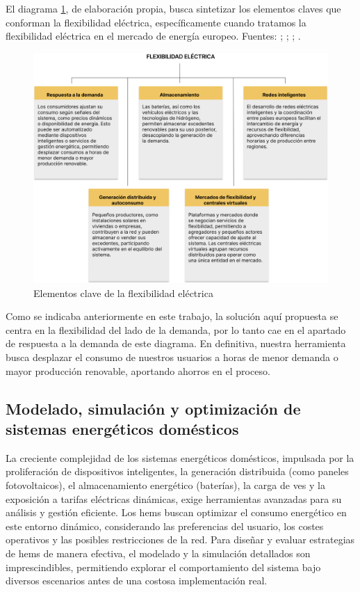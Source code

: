 \documentclass[11pt,a4paper]{book}
\begin{document}
El diagrama \ref{fig:flexibilidad}, de elaboración propia, busca sintetizar los elementos claves que conforman la flexibilidad eléctrica, específicamente cuando tratamos la flexibilidad eléctrica en el mercado de energía europeo. Fuentes: \cite{iberdrolaFlexibilidad2024}; \cite{centralesVirtuales2024}; \cite{cordisParticipation2024}; \cite{irenaFlexibilidad2018}.


\begin{figure}
    \centering
    \includegraphics[width=1\linewidth]{fig/image.png}
    \caption{Elementos clave de la flexibilidad eléctrica}
    \label{fig:flexibilidad}
\end{figure}
Como se indicaba anteriormente en este trabajo, la solución aquí \mbox{propuesta} se centra en la flexibilidad del lado de la demanda, por lo tanto cae en el apartado de respuesta a la demanda de este diagrama. En definitiva, nuestra herramienta busca desplazar el consumo de nuestros usuarios a horas de menor demanda o mayor producción renovable, aportando ahorros en el proceso.

\subsection{Modelado, simulación y optimización de sistemas energéticos domésticos}
\label{sec:modelado_simulacion_optimizacion_hems}

La creciente complejidad de los sistemas energéticos domésticos, impulsada por la proliferación de dispositivos inteligentes, la generación distribuida (como paneles fotovoltaicos), el almacenamiento energético (baterías), la carga de \gls{ves} y la exposición a tarifas eléctricas dinámicas, \mbox{exige} herramientas avanzadas para su análisis y gestión eficiente. Los \gls{hems} buscan optimizar el consumo energético en este entorno dinámico, considerando las preferencias del usuario, los costes operativos y las posibles restricciones de la red. Para diseñar y evaluar estrategias de \gls{hems} de manera efectiva, el modelado y la simulación detallados son imprescindibles, permitiendo explorar el comportamiento del sistema bajo diversos escenarios antes de una costosa implementación real.
\end{document}
